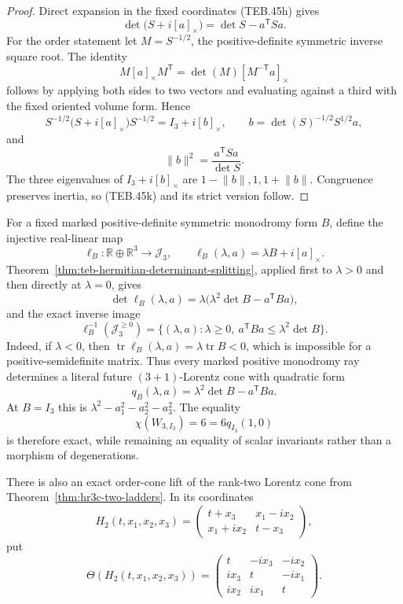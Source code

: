 \begin{proof}
Direct expansion in the fixed coordinates (TEB.45h) gives
\[
 \det\bigl(S+i[a]_{\times}\bigr)=\det S-a^{\mathsf T}Sa.
\]
For the order statement let \(M=S^{-1/2}\), the positive-definite symmetric
inverse square root.  The identity
\[
 M[a]_{\times}M^{\mathsf T}
 =\det(M)[M^{-\mathsf T}a]_{\times}                       \tag{TEB.45l}
\]
follows by applying both sides to two vectors and evaluating against a third
with the fixed oriented volume form.  Hence
\[
 S^{-1/2}\bigl(S+i[a]_{\times}\bigr)S^{-1/2}
 =I_3+i[b]_{\times},
 \qquad b=\det(S)^{-1/2}S^{1/2}a,
\]
and
\[
 \lVert b\rVert^2=\frac{a^{\mathsf T}Sa}{\det S}.
\]
The three eigenvalues of \(I_3+i[b]_{\times}\) are
\(1-\lVert b\rVert,1,1+\lVert b\rVert\).  Congruence preserves inertia,
so (TEB.45k) and its strict version follow.
\end{proof}

For a fixed marked positive-definite symmetric monodromy form \(B\), define
the injective real-linear map
\[
 \ell_B:\mathbb R\oplus\mathbb R^3\longrightarrow\mathcal J_3,
 \qquad \ell_B(\lambda,a)=\lambda B+i[a]_{\times}.        \tag{TEB.45m}
\]
Theorem~\ref{thm:teb-hermitian-determinant-splitting}, applied first to
\(\lambda>0\) and then directly at \(\lambda=0\), gives
\[
 \det\ell_B(\lambda,a)
 =\lambda\bigl(\lambda^2\det B-a^{\mathsf T}Ba\bigr),    \tag{TEB.45n}
\]
and the exact inverse image
\[
 \boxed{
\ell_B^{-1}(\mathcal J_3^{\geq0})
=\{(\lambda,a):\lambda\geq0,
       \ a^{\mathsf T}Ba\leq\lambda^2\det B\}.}         \tag{TEB.45o}
\]
Indeed, if \(\lambda<0\), then
\(\operatorname{tr}\ell_B(\lambda,a)=\lambda\operatorname{tr}B<0\),
which is impossible for a positive-semidefinite matrix.
Thus every marked positive monodromy ray determines a literal future
\((3+1)\)-Lorentz cone with quadratic form
\[
 q_B(\lambda,a)=\lambda^2\det B-a^{\mathsf T}Ba.          \tag{TEB.45p}
\]
At \(B=I_3\) this is
\(\lambda^2-a_1^2-a_2^2-a_3^2\).  The equality
\[
 \chi(W_{3,I_3})=6=6q_{I_3}(1,0)                         \tag{TEB.45q}
\]
is therefore exact, while remaining an equality of scalar invariants rather
than a morphism of degenerations.

There is also an exact order-cone lift of the rank-two Lorentz cone from
Theorem~\ref{thm:hr3c-two-ladders}.  In its coordinates
\[
 H_2(t,x_1,x_2,x_3)=
 \begin{pmatrix}
  t+x_3&x_1-i x_2\\
  x_1+i x_2&t-x_3
 \end{pmatrix},
\]
put
\[
 \Theta(H_2(t,x_1,x_2,x_3))=
 \begin{pmatrix}
  t&-i x_3&-i x_2\\
  i x_3&t&-i x_1\\
  i x_2&i x_1&t
 \end{pmatrix}.                                         \tag{TEB.45r}
\]


